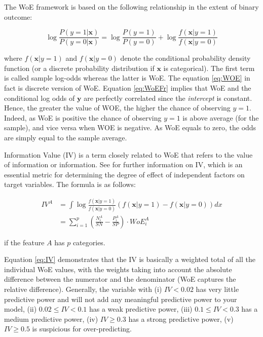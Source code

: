 The WoE framework is based on the following relationship in the extent
of binary outcome:

\begin{equation}
\label{eq:WoEFr}
\log \frac{P(y=1|\mathbf{x})}{P(y=0|\mathbf{x})} = \log \frac{P(y=1)}{P(y=0)} + \log\frac{f(\mathbf{x}|y=1)}{f(\mathbf{x}|y=0)}
\end{equation}

where \(f(\mathbf{x}|y=1)\) and \(f(\mathbf{x}|y=0)\) denote the
conditional probability density function (or a discrete probability
distribution if \(\mathbf{x}\) is categorical). The first term is called
sample log-odds whereas the latter is WoE. The equation \ref{eq:WOE} in
fact is discrete version of WoE. Equation \ref{eq:WoEFr} implies that
WoE and the conditional log odds of \(\mathbf{y}\) are perfectly
correlated since the \emph{intercept} is constant. Hence, the greater
the value of WOE, the higher the chance of observing \(y=1\). Indeed, as
WoE is positive the chance of observing \(y=1\) is above average (for
the sample), and vice versa when WOE is negative. As WoE equals to zero,
the odds are simply equal to the sample average.

Information Value (IV) is a term closely related to WoE that refers to
the value of information or information. See \citet{Chen2020} for
further information on IV, which is an essential metric for determining
the degree of effect of independent factors on target variables. The
formula is as follows:

\begin{equation}
\label{eq:IV}
\begin{aligned}
IV^A &= \int \log \frac{f(\mathbf{x}|y=1)}{f(\mathbf{x}|y=0)}(f(\mathbf{x}|y=1) - f(\mathbf{x}|y=0))dx \\
&= \sum_{i=1}^p \left( \frac{N_i^A}{SN} - \frac{P_i^A}{SP} \right) \cdot WoE_i^A
\end{aligned}
\end{equation}

if the feature \(A\) has \(p\) categories.

Equation \ref{eq:IV} demonstrates that the IV is basically a weighted
total of all the individual WoE values, with the weights taking into
account the absolute difference between the numerator and the
denominator (WoE captures the relative difference). Generally, the
variable with (i) \(IV < 0.02\) has very little predictive power and
will not add any meaningful predictive power to your model, (ii)
\(0.02 \le IV < 0.1\) has a weak predictive power, (iii)
\(0.1 \le IV < 0.3\) has a medium predictive power, (iv) \(IV \ge 0.3\)
has a strong predictive power, (v) \(IV \ge 0.5\) is suspicious for
over-predicting.

